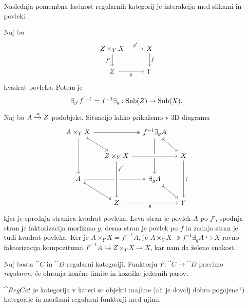 \documentclass[../kategoricna_logika.tex]{subfiles}
\begin{document}
Naslednja pomembna lastnost regularnih kategorij je interakcija med slikami in povleki.
\begin{lema}
  Naj bo
  \begin{equation*}
    \begin{tikzcd}
      Z \times_Y X \ar[d, "f'"'] \ar[r, "g'"] & X \ar[d, "f"] \\
      Z \ar[r, "g"'] & Y
    \end{tikzcd}
  \end{equation*}
  kvadrat povleka. Potem je
  $$\exists_{g'}f^{'-1} = f^{-1}\exists_g : \operatorname{Sub}(Z) \to \operatorname{Sub}(X).$$
\end{lema}
\begin{dokaz}
  Naj bo $A \xhookrightarrow{\alpha} Z$ podobjekt.
  Situacijo lahko prikažemo v $3$D diagramu
  \begin{equation*}
  \begin{tikzcd}[column sep=small]
    A \times_Y X \ar[dd] \ar[dr, tail] \ar[rr, two heads] & & f^{-1}\exists_g A \ar[dd] \ar[dr, tail] & \\
    & Z \times_Y X  \ar[rr, crossing over] & & X \ar[dd, "f"] \\
    A \ar[dr, tail] \ar[rr, two heads] & & \exists_g A \ar[dr, tail] & \\
    & Z \ar[rr, "g"'] \ar[from=uu, pos=0.2, crossing over, "f'"] & & Y
  \end{tikzcd}
  \end{equation*}
  kjer je sprednja stranica kvadrat povleka.
  Leva stran je povlek $A$ po $f'$, spodnja stran je faktorizacija morfizma $g$,
  desna stran je povlek po $f$ in zadnja stran je tudi kvadrat povleka.
  Ker je $A \times_Y X = f'^{-1}A$, je $A \times_Y X \twoheadrightarrow f^{-1}\exists_g A \hookrightarrow X$
  ravno faktorizacija kompozituma $f'^{-1}A \hookrightarrow Z \times_Y X \to X$, kar nam da želeno enakost.
\end{dokaz}
\begin{definicija}
  Naj bosta $\cat{C}$ in $\cat{D}$ regularni kategoriji.
  Funktorju ${F : \cat{C} \to \cat{D}}$ pravimo \emph{regularen}, če ohranja končne limite in kozožke jedernih parov.
\end{definicija}
\begin{definicija}
  $\cat{RegCat}$ je kategorija v kateri so objekti majhne (ali je dovolj dobro pogojene?) kategorije in morfizmi regularni funktorji med njimi.
\end{definicija}
\end{document}
